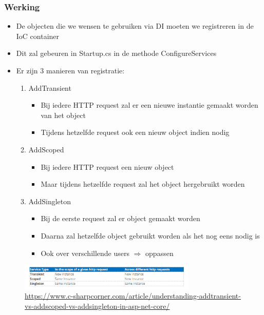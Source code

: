 \documentclass{article}
\begin{document}
\subsubsection{Werking}

\begin{itemize}
    \item De objecten die we wensen te gebruiken via DI moeten we registreren in de IoC container
    \item Dit zal gebeuren in Startup.cs in de methode ConfigureServices
    \item Er zijn 3 manieren van registratie:
    \begin{enumerate}
        \item AddTransient
        \begin{itemize}
            \item Bij iedere HTTP request zal er een nieuwe instantie gemaakt worden van het object
            \item Tijdens hetzelfde request ook een nieuw object indien nodig
        \end{itemize}
        \item AddScoped
        \begin{itemize}
            \item Bij iedere HTTP request een nieuw object
            \item Maar tijdens hetzelfde request zal het object hergebruikt worden
        \end{itemize}
        \item AddSingleton
        \begin{itemize}
            \item Bij de eerste request zal er object gemaakt worden
            \item Daarna zal hetzelfde object gebruikt worden als het nog eens nodig is
            \item Ook over verschillende users $\Rightarrow$ oppassen
        \end{itemize}
    \end{enumerate}
\end{itemize}


\begin{figure}[H]
    \centering
    \includegraphics[width=0.75\textwidth]{dependency-injection-registratie.png}
    \caption{\url{https://www.c-sharpcorner.com/article/understanding-addtransient-vs-addscoped-vs-addsingleton-in-asp-net-core/}}
\end{figure}
\end{document}
